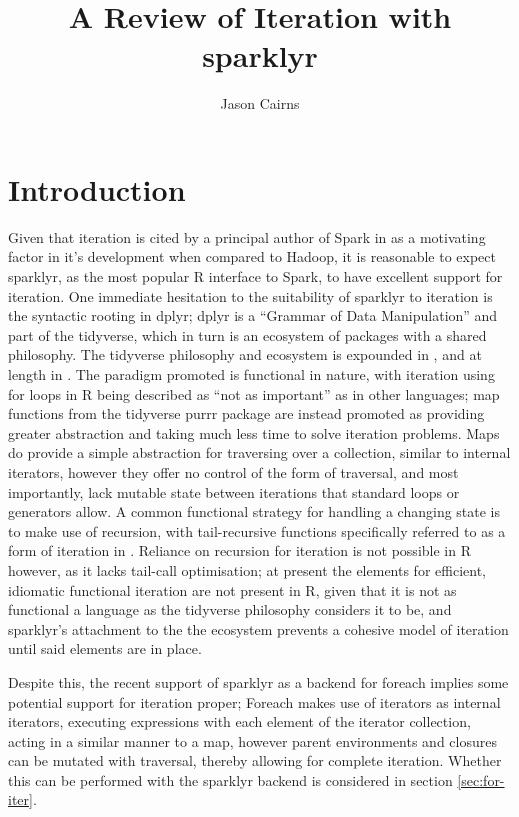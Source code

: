 \documentclass[10pt,a4paper]{article}
\begin{document}
\title{A Review of Iteration with sparklyr}
\author{Jason Cairns}
  
\maketitle{}

\section{Introduction}
Given that iteration is cited by a principal author of Spark in
\citeauthor{zaharia2010spark} as a motivating factor in it's development when
compared to Hadoop, it is reasonable to expect sparklyr, as the most popular R
interface to Spark, to have excellent support for iteration.
One immediate hesitation to the suitability of sparklyr to iteration is the
syntactic rooting in dplyr; dplyr is a ``Grammar of Data Manipulation'' and part
of the tidyverse, which in turn is an ecosystem of packages with a shared
philosophy. 
The tidyverse philosophy and ecosystem is expounded in
\citeauthor{wickham2019welcome}, and at length in \citeauthor{wickham2016r}. 
The paradigm promoted is functional in nature, with iteration using for loops
in R being described as ``not as important'' as in other languages; 
map functions from the tidyverse purrr package are instead promoted as
providing greater abstraction and taking much less time to solve iteration
problems.
Maps do provide a simple abstraction for traversing over a collection, similar
to internal iterators, however they offer no control of the form of traversal,
and most importantly, lack mutable state between iterations that standard loops
or generators allow.
A common functional strategy for handling a changing state is to make use of
recursion, with tail-recursive functions specifically referred to as a form of
iteration in \citeauthor{abelson1996structure}.
Reliance on recursion for iteration is not possible in R however, as it lacks
tail-call optimisation;
at present the elements for efficient, idiomatic functional iteration are not
present in R, given that it is not as functional a language as the tidyverse
philosophy considers it to be, and sparklyr's attachment to the the ecosystem
prevents a cohesive model of iteration until said elements are in place.

Despite this, the recent support of sparklyr as a backend for foreach implies
some potential support for iteration proper;
Foreach makes use of iterators as internal iterators, executing expressions
with each element of the iterator collection, acting in a similar manner to a
map, however parent environments and closures can be mutated with traversal,
thereby allowing for complete iteration.
Whether this can be performed with the sparklyr backend is considered in
section \ref{sec:for-iter}.
\end{document}
